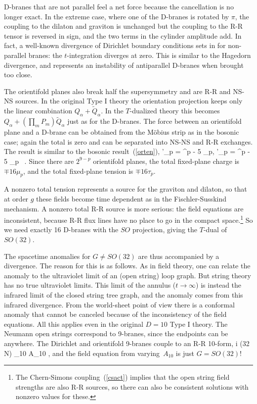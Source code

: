 D-branes that are not parallel feel a
net force because the cancellation is no longer exact.  In the extreme case,
where one of the D-branes is rotated by $\pi$, the coupling to the dilaton
and graviton is unchanged but the coupling to the R-R tensor is reversed in
sign, and the two terms in the cylinder amplitude add.  In fact, a
well-known divergence of Dirichlet boundary conditions sets in for
non-parallel branes: the
$t$-integration diverges at zero.  This is similar to the Hagedorn
divergence, and represents an instability of antiparallel D-branes when brought
too close.\cite{tomlen}

The orientifold planes also break half the supersymmetry and are R-R and
NS-NS sources.  In the original Type I theory the orientation projection
keeps only the linear combination $Q_\alpha + \tilde
Q_\alpha$.  In the $T$-dualized theory this becomes $Q_\alpha + (\prod_m
P_m)
\tilde Q_\alpha$ just as for the D-branes.  The force between an
orientifold plane and a D-brane can be obtained from the M\"obius strip as
in the bosonic case; again the total is zero and can be separated into
NS-NS and R-R exchanges.  The result is similar to the bosonic
result~(\ref{orten}),
\be
\mu'_p = ^{p - 5} \mu_p, \qquad \tau'_p = ^{p - 5} \tau_p \ .
\ee
Since there are $2^{9-p}$ orientifold planes, the total fixed-plane charge
is $\mp 16 \mu_p$, and the total fixed-plane tension is $\mp 16 \tau_p$.

A nonzero total tension represents a source for the graviton and dilaton,
so that at order $g$ these fields become time dependent as in the
Fischler-Susskind mechanism.\cite{fsuss}
A nonzero total R-R source is more serious: the field equations are
inconsistent, because R-R flux lines have no place to go in the compact
space.\footnote
{The Chern-Simons coupling~(\ref{csact}) implies that the open
string field strengths are also R-R sources, so there can also be
consistent solutions with nonzero values for these.}
So we need exactly 16
D-branes with the $SO$ projection, giving the $T$-dual of $SO(32)$.  

The spacetime anomalies for $G \neq SO(32)$ are thus accompanied by a
divergence.\cite{gsdiv}  The reason for this is as follows.  As in field
theory, one can relate the anomaly to the ultraviolet limit of an (open
string) loop graph.  But string theory has no true ultraviolet limits.  This
limit of the annulus ($t\to \infty$) is instead the infrared limit of the
closed string tree graph, and the anomaly comes from this infrared
divergence.  From the 
world-sheet point of view there is a conformal anomaly that cannot be
canceled because of the inconsistency of the field equations.  All this
applies even in the original $D=10$ Type I theory.\cite{rrex}  The Neumann
open strings correspond to 9-branes, since the endpoints can be anywhere. 
The Dirichlet and orientifold 9-branes couple to an R-R 10-form,
\be
i (32 \mp N) {\mu_{10}} \int A_{10} ,
\ee
and the field equation from varying~$A_{10}$ is just $G =
SO(32)$!\,\cite{rrex}

